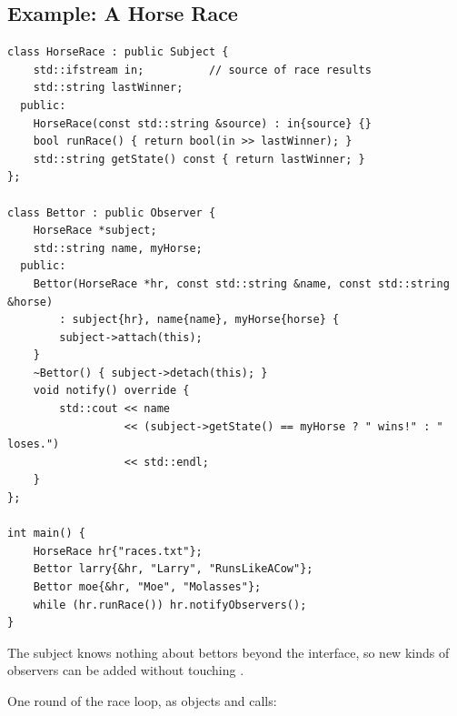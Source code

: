\subsection{Example: A Horse Race}
\begin{lstlisting}[style=cpp]
class HorseRace : public Subject {
    std::ifstream in;          // source of race results
    std::string lastWinner;
  public:
    HorseRace(const std::string &source) : in{source} {}
    bool runRace() { return bool(in >> lastWinner); }
    std::string getState() const { return lastWinner; }
};

class Bettor : public Observer {
    HorseRace *subject;
    std::string name, myHorse;
  public:
    Bettor(HorseRace *hr, const std::string &name, const std::string &horse)
        : subject{hr}, name{name}, myHorse{horse} {
        subject->attach(this);
    }
    ~Bettor() { subject->detach(this); }
    void notify() override {
        std::cout << name
                  << (subject->getState() == myHorse ? " wins!" : " loses.")
                  << std::endl;
    }
};

int main() {
    HorseRace hr{"races.txt"};
    Bettor larry{&hr, "Larry", "RunsLikeACow"};
    Bettor moe{&hr, "Moe", "Molasses"};
    while (hr.runRace()) hr.notifyObservers();
}
\end{lstlisting}
The subject knows nothing about bettors beyond the  interface, so
new kinds of observers can be added without touching .

One round of the race loop, as objects and calls:
\begin{center}
\end{center}

